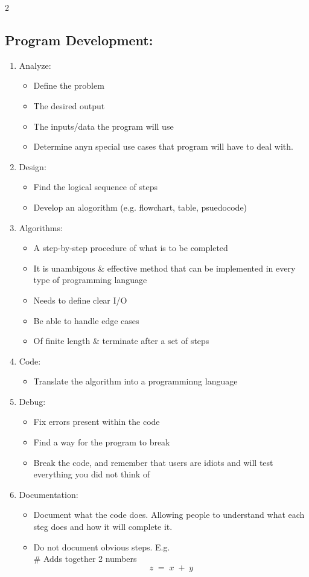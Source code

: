 \documentclass[a4paper]{report}
\begin{document}
\begin{flushleft}
\begin{multicols}{2}
	\subsection*{Program Development:}
	\begin{enumerate}
		\item Analyze:
		\begin{itemize}
			\item Define the problem
			\item The desired output
			\item The inputs/data the program will use
			\item Determine anyn special use cases that program will have to deal with.
		\end{itemize}
		\item Design:
		\begin{itemize}
			\item Find the logical sequence of steps
			\item Develop an alogorithm (e.g. flowchart, table, psuedocode)
		\end{itemize}
		\item Algorithms:
		\begin{itemize}
			\item A step-by-step procedure of what is to be completed
			\item It is unambigous \& effective method that can be implemented in every type of programming language
			\item Needs to define clear I/O
			\item Be able to handle edge cases
			\item Of finite length \& terminate after a set of steps
		\end{itemize}
		\item Code:
		\begin{itemize}
			\item Translate the algorithm into a programminng language
		\end{itemize}
		\item Debug:
		\begin{itemize}
			\item Fix errors present within the code
			\item Find a way for the program to break
			\item Break the code, and remember that users are idiots and will test everything you did not think of
		\end{itemize}
		\item Documentation:
		\begin{itemize}
			\item Document what the code does. Allowing people to understand what each steg does and how it will complete it.
			\item Do not document obvious steps. E.g. \\
			\# Adds together 2 numbers
			$$z\;=\;x\;+\;y$$
		\end{itemize}
	\end{enumerate}


\end{multicols}
\end{flushleft}
\end{document}
